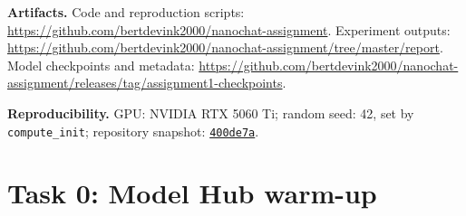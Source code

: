 \documentclass{article}
\begin{document}

\textbf{Artifacts.} Code and reproduction scripts:
\url{https://github.com/bertdevink2000/nanochat-assignment}. Experiment outputs:
\url{https://github.com/bertdevink2000/nanochat-assignment/tree/master/report}.
Model checkpoints and metadata:
\url{https://github.com/bertdevink2000/nanochat-assignment/releases/tag/assignment1-checkpoints}.

\textbf{Reproducibility.} GPU: NVIDIA RTX 5060 Ti; random seed: 42, set by
\texttt{compute\_init}; repository snapshot:
\href{https://github.com/bertdevink2000/nanochat-assignment/commit/400de7a951f128feb8ab5748681102d43bcab4c5}{\texttt{400de7a}}.

\section{Task 0: Model Hub warm-up}
\end{document}
